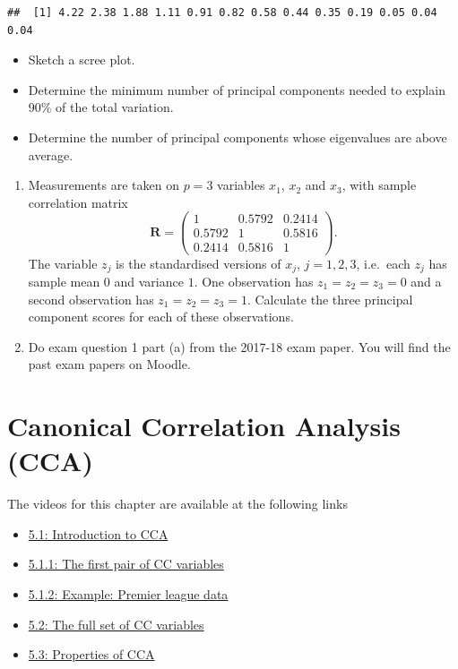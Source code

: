 \documentclass[]{book}
\providecommand{\tightlist}{%
  \setlength{\itemsep}{0pt}\setlength{\parskip}{0pt}}
\theoremstyle{definition}
\theoremstyle{definition}
\theoremstyle{definition}
\theoremstyle{remark}
\begin{document}
\begin{verbatim}
##  [1] 4.22 2.38 1.88 1.11 0.91 0.82 0.58 0.44 0.35 0.19 0.05 0.04 0.04
\end{verbatim}

\begin{itemize}
\tightlist
\item
  Sketch a scree plot.
\item
  Determine the minimum number of principal components needed to explain 90\% of the total variation.
\item
  Determine the number of principal components whose eigenvalues are above average.
\end{itemize}

\begin{enumerate}
\def\labelenumi{\arabic{enumi}.}
\setcounter{enumi}{3}
\item
  Measurements are taken on \(p=3\) variables \(x_1\), \(x_2\) and \(x_3\), with sample correlation matrix
  \[
   \mathbf R= \begin{pmatrix} 1 & 0.5792 & 0.2414 \\ 0.5792 & 1 & 0.5816 \\ 0.2414 & 0.5816 & 1 \end{pmatrix}.
  \]
  The variable \(z_j\) is the standardised versions of \(x_j\), \(j=1,2,3\), i.e.~each \(z_j\) has sample mean \(0\) and variance \(1\).
  One observation has \(z_1 = z_2 = z_3 = 0\) and a second observation has \(z_1 = z_2 = z_3 =1\). Calculate the three
  principal component scores for
  each of these observations.
\item
  Do exam question 1 part (a) from the 2017-18 exam paper. You will find the past exam papers on Moodle.
\end{enumerate}

\hypertarget{cca}{%
\chapter{Canonical Correlation Analysis (CCA)}\label{cca}}

The videos for this chapter are available at the following links

\begin{itemize}
\tightlist
\item
  \href{https://mediaspace.nottingham.ac.uk/media/CCA+Introduction/1_qhk7v35f}{5.1: Introduction to CCA}
\item
  \href{https://mediaspace.nottingham.ac.uk/media/CCAA+First+CC/1_yjm6kkxf}{5.1.1: The first pair of CC variables}
\item
  \href{https://mediaspace.nottingham.ac.uk/media/CCAA+Football+Example/1_r2v6924j}{5.1.2: Example: Premier league data}
\item
  \href{https://mediaspace.nottingham.ac.uk/media/CCAA+Full+Set/1_xmdoi9i6}{5.2: The full set of CC variables}
\item
  \href{https://mediaspace.nottingham.ac.uk/media/CCA\%3A\%20Properties/1_g24h27bj}{5.3: Properties of CCA}
\end{itemize}
\end{document}
